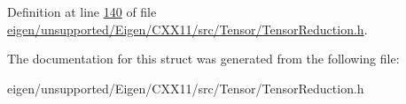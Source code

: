 Definition at line \hyperlink{eigen_2unsupported_2_eigen_2_c_x_x11_2src_2_tensor_2_tensor_reduction_8h_source_l00140}{140} of file \hyperlink{eigen_2unsupported_2_eigen_2_c_x_x11_2src_2_tensor_2_tensor_reduction_8h_source}{eigen/unsupported/\+Eigen/\+C\+X\+X11/src/\+Tensor/\+Tensor\+Reduction.\+h}.



The documentation for this struct was generated from the following file\+:\begin{DoxyCompactItemize}
\item 
eigen/unsupported/\+Eigen/\+C\+X\+X11/src/\+Tensor/\+Tensor\+Reduction.\+h\end{DoxyCompactItemize}

